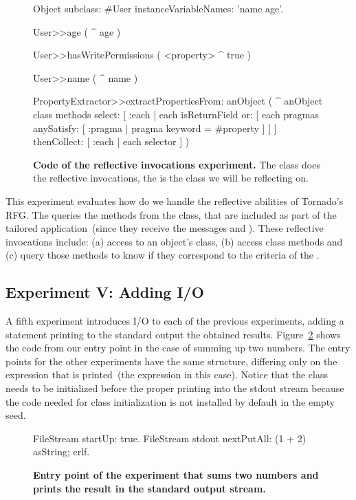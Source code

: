 \begin{figure}[ht]
\small
\begin{code}
Object subclass: #User
	instanceVariableNames: 'name age'.

User>>age (
	^ age )

User>>hasWritePermissions (
	<property>
	^ true )

User>>name (
	^ name )

PropertyExtractor>>extractPropertiesFrom: anObject (
	^ anObject class methods
		select: [ :each | each isReturnField or: [ each pragmas anySatisfy: [ :pragma | pragma keyword = #property ] ] ]
		thenCollect: [ :each | each selector ] )

\end{code}
\caption{\small \textbf{Code of the reflective invocations experiment.} The  class does the reflective invocations, the  is the class we will be reflecting on.\label{fig:reflective_invocations}}
\end{figure}

This experiment evaluates how do we handle the reflective abilities of Tornado's RFG. The  queries the methods from the  class, that are included as part of the tailored application~(since they receive the messages  and ). These reflective invocations include: (a) access to an object's class, (b) access class methods and (c) query those methods to know if they correspond to the criteria of the .

\subsection{Experiment V: Adding I/O} \label{sec:results_helloworld}

A fifth experiment introduces I/O to each of the previous experiments, adding a statement printing to the standard output the obtained results. Figure~\ref{fig:hello_world_entry_point} shows the code from our entry point in the case of summing up two numbers. The entry points for the other experiments have the same structure, differing only on the expression that is printed~(the  expression in this case). Notice that the  class needs to be initialized before the proper printing into the stdout stream because the code needed for class initialization is not installed by default in the empty seed.

\begin{figure}[ht]
\small
\begin{code}
FileStream startUp: true.
FileStream stdout 
	nextPutAll: (1 + 2) asString;
	crlf.
\end{code}
\caption{\small \textbf{Entry point of the experiment that sums two numbers and prints the result in the standard output stream.}\label{fig:hello_world_entry_point}}
\end{figure}

